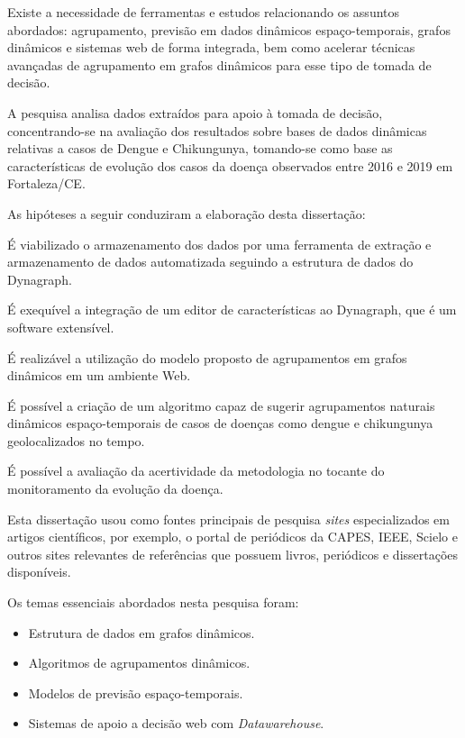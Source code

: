 Existe a necessidade de ferramentas e estudos relacionando os assuntos abordados: agrupamento, previsão em dados dinâmicos espaço-temporais, grafos dinâmicos e sistemas web de forma integrada, bem como acelerar técnicas avançadas de agrupamento em grafos dinâmicos para esse tipo de tomada de decisão.

A pesquisa analisa dados extraídos para apoio à tomada de decisão, concentrando-se na avaliação dos resultados sobre bases de dados dinâmicas relativas a casos de Dengue e Chikungunya, tomando-se como base as características de evolução dos casos da doença observados entre 2016 e 2019 em Fortaleza/CE.

As hipóteses a seguir conduziram a elaboração desta dissertação:
\begin{alineas}
    \item É viabilizado o armazenamento dos dados por uma ferramenta de extração e armazenamento de dados automatizada seguindo a estrutura de dados do Dynagraph.
	\item É exequível a integração de um editor de características ao Dynagraph, que é um software extensível.	
	\item É realizável a utilização do modelo proposto de agrupamentos em grafos dinâmicos em um ambiente Web.	
	\item É possível a criação de um algoritmo capaz de sugerir agrupamentos naturais dinâmicos espaço-temporais de casos de doenças como dengue e chikungunya geolocalizados no tempo.
	\item É possível a avaliação da acertividade da metodologia no tocante do monitoramento da evolução da doença.
\end{alineas}


Esta dissertação usou como fontes principais de pesquisa \textit{sites} especializados em artigos científicos, por exemplo, o portal de periódicos da \acrshort{CAPES}, \acrshort{IEEE}, Scielo e outros sites relevantes de referências que possuem livros, periódicos e dissertações disponíveis.

Os temas essenciais abordados nesta pesquisa foram:
\begin{itemize}
	\item Estrutura de dados em grafos dinâmicos.
	\item Algoritmos de agrupamentos dinâmicos.
	\item Modelos de previsão espaço-temporais.
	\item Sistemas de apoio a decisão web com \emph{Datawarehouse}.
\end{itemize}


